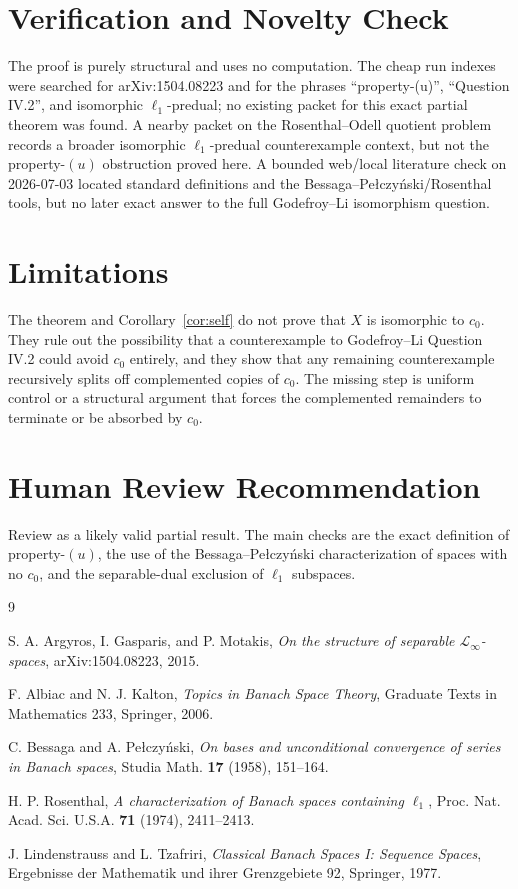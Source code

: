 \documentclass[11pt]{article}
\newcommand{\ellone}{\ell_1}
\newcommand{\czero}{c_0}
\begin{document}
\section*{Verification and Novelty Check}

The proof is purely structural and uses no computation.  The cheap run indexes
were searched for arXiv:1504.08223 and for the phrases
``property-(u)'', ``Question IV.2'', and isomorphic \(\ellone\)-predual; no
existing packet for this exact partial theorem was found.  A nearby packet on
the Rosenthal--Odell quotient problem records a broader isomorphic
\(\ellone\)-predual counterexample context, but not the property-\((u)\)
obstruction proved here.  A bounded web/local literature check on
2026-07-03 located standard definitions and the Bessaga--Pe\l czy\'nski/Rosenthal
tools, but no later exact answer to the full Godefroy--Li isomorphism question.

\section*{Limitations}

The theorem and Corollary~\ref{cor:self} do not prove that \(X\) is isomorphic
to \(\czero\).  They rule out the possibility that a counterexample to
Godefroy--Li Question IV.2 could avoid \(\czero\) entirely, and they show that
any remaining counterexample recursively splits off complemented copies of
\(\czero\).  The missing step is uniform control or a structural argument that
forces the complemented remainders to terminate or be absorbed by \(\czero\).

\section*{Human Review Recommendation}

Review as a likely valid partial result.  The main checks are the exact
definition of property-\((u)\), the use of the Bessaga--Pe\l czy\'nski
characterization of spaces with no \(\czero\), and the separable-dual
exclusion of \(\ellone\) subspaces.

\begin{thebibliography}{9}

S. A. Argyros, I. Gasparis, and P. Motakis,
\emph{On the structure of separable \(\mathcal L_\infty\)-spaces},
arXiv:1504.08223, 2015.

F. Albiac and N. J. Kalton,
\emph{Topics in Banach Space Theory},
Graduate Texts in Mathematics 233, Springer, 2006.

C. Bessaga and A. Pe\l czy\'nski,
\emph{On bases and unconditional convergence of series in Banach spaces},
Studia Math. \textbf{17} (1958), 151--164.

H. P. Rosenthal,
\emph{A characterization of Banach spaces containing \(\ell_1\)},
Proc. Nat. Acad. Sci. U.S.A. \textbf{71} (1974), 2411--2413.

J. Lindenstrauss and L. Tzafriri,
\emph{Classical Banach Spaces I: Sequence Spaces},
Ergebnisse der Mathematik und ihrer Grenzgebiete 92, Springer, 1977.

\end{thebibliography}
\end{document}
